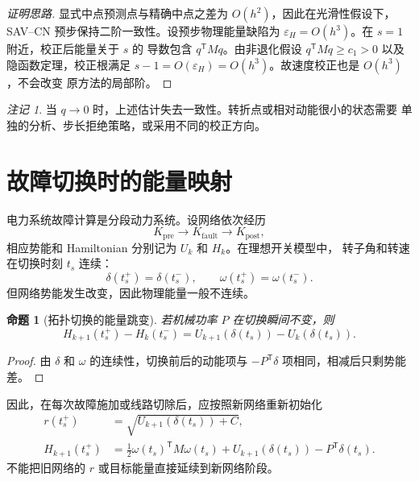 \documentclass[UTF8,11pt,a4paper]{ctexart}
\newtheorem{proposition}[theorem]{命题}
\theoremstyle{definition}
\theoremstyle{remark}
\newtheorem{remark}[theorem]{注记}
\newcommand{\trans}{\mathsf{T}}
\begin{document}
\begin{proof}[证明思路]
显式中点预测点与精确中点之差为 \(O(h^2)\)，因此在光滑性假设下，
SAV--CN 预步保持二阶一致性。设预步物理能量缺陷为
\(\varepsilon_H=O(h^3)\)。在 \(s=1\) 附近，校正后能量关于 \(s\) 的
导数包含 \(q^{\trans}Mq\)。由非退化假设
\(q^{\trans}Mq\geq c_1>0\) 以及隐函数定理，校正根满足
\(s-1=O(\varepsilon_H)=O(h^3)\)。故速度校正也是 \(O(h^3)\)，不会改变
原方法的局部阶。
\end{proof}

\begin{remark}
当 \(q\to0\) 时，上述估计失去一致性。转折点或相对动能很小的状态需要
单独的分析、步长拒绝策略，或采用不同的校正方向。
\end{remark}

\section{故障切换时的能量映射}

电力系统故障计算是分段动力系统。设网络依次经历
\begin{equation}
  K_{\mathrm{pre}}
  \longrightarrow K_{\mathrm{fault}}
  \longrightarrow K_{\mathrm{post}},
\end{equation}
相应势能和 Hamiltonian 分别记为 \(U_k\) 和 \(H_k\)。在理想开关模型中，
转子角和转速在切换时刻 \(t_s\) 连续：
\begin{equation}
  \delta(t_s^+)=\delta(t_s^-),
  \qquad
  \omega(t_s^+)=\omega(t_s^-).
\end{equation}
但网络势能发生改变，因此物理能量一般不连续。

\begin{proposition}[拓扑切换的能量跳变]
若机械功率 \(P\) 在切换瞬间不变，则
\begin{equation}
  \boxed{
  H_{k+1}(t_s^+)-H_k(t_s^-)
  =U_{k+1}(\delta(t_s))-U_k(\delta(t_s)).}
  \label{eq:switch-jump}
\end{equation}
\end{proposition}

\begin{proof}
由 \(\delta\) 和 \(\omega\) 的连续性，切换前后的动能项与
\(-P^{\trans}\delta\) 项相同，相减后只剩势能差。
\end{proof}

因此，在每次故障施加或线路切除后，应按照新网络重新初始化
\begin{align}
  r(t_s^+)
  &=\sqrt{U_{k+1}(\delta(t_s))+C},
  \label{eq:switch-r-reset}\\
  H_{k+1}(t_s^+)
  &=\frac12\omega(t_s)^{\trans}M\omega(t_s)
    +U_{k+1}(\delta(t_s))-P^{\trans}\delta(t_s).
  \label{eq:switch-H-reset}
\end{align}
不能把旧网络的 \(r\) 或目标能量直接延续到新网络阶段。
\end{document}
